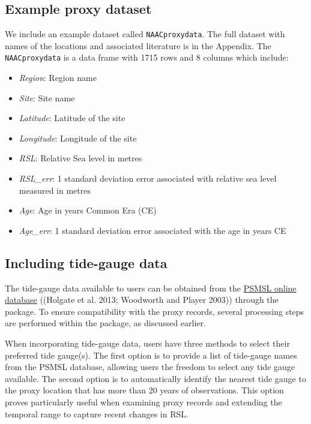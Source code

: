 \hypertarget{exampledataset}{%
\subsection{Example proxy dataset}\label{exampledataset}}

We include an example dataset called \texttt{NAACproxydata}. The full dataset with names of the locations and associated literature is in the Appendix. The \texttt{NAACproxydata} is a data frame with 1715 rows and 8 columns which include:

\begin{itemize}
\tightlist
\item
  \emph{Region}: Region name
\item
  \emph{Site}: Site name
\item
  \emph{Latitude}: Latitude of the site
\item
  \emph{Longitude}: Longitude of the site
\item
  \emph{RSL}: Relative Sea level in metres
\item
  \emph{RSL\_err}: 1 standard deviation error associated with relative sea level measured in metres
\item
  \emph{Age}: Age in years Common Era (CE)
\item
  \emph{Age\_err}: 1 standard deviation error associated with the age in years CE
\end{itemize}

\hypertarget{additionaldata}{%
\subsection{Including tide-gauge data}\label{additionaldata}}

The tide-gauge data available to users can be obtained from the \href{https://psmsl.org/data/obtaining/complete.php}{PSMSL online database} ((Holgate et al. 2013; Woodworth and Player 2003)) through the  package. To ensure compatibility with the proxy records, several processing steps are performed within the package, as discussed earlier.

When incorporating tide-gauge data, users have three methods to select their preferred tide gauge(s). The first option is to provide a list of tide-gauge names from the PSMSL database, allowing users the freedom to select any tide gauge available. The second option is to automatically identify the nearest tide gauge to the proxy location that has more than 20 years of observations. This option proves particularly useful when examining proxy records and extending the temporal range to capture recent changes in RSL.

